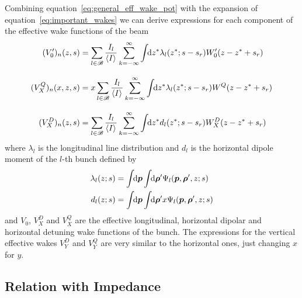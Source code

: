     Combining equation~\eqref{eq:general_eff_wake_pot} with the expansion of equation~\eqref{eq:important_wakes} we can derive expressions for each component of the effective wake functions of the beam
    \begin{subequations}\label{eq:general_eff_wakes}
    \begin{align}\label{eq:general_eff_long_wake}
	  	(V_0')_n(z, s) &= \sum_{l\in\mathscr{B}}\frac{I_l}{\left\langle I \right\rangle_{{}}}\sum_{k=-\infty}^\infty\int\!\!\text{d}z^* \lambda_l(z^*; s - s_r)W'_0(z - z^* + s_r)
        \\[3mm]\label{eq:general_eff_quad_wake}
	  	(V^Q_X)_n(x, z, s) &= x\sum_{l\in\mathscr{B}}\frac{I_l}{\left\langle I \right\rangle_{{}}}\sum_{k=-\infty}^\infty\int\!\!\text{d}z^* \lambda_l(z^*; s - s_r)W^Q(z-z^* + s_r)
        \\[3mm]\label{eq:general_eff_dip_wake}
	  	(V^D_X)_n(z, s) &= \sum_{l\in\mathscr{B}}\frac{I_l}{\left\langle I \right\rangle_{{}}}\sum_{k=-\infty}^\infty\int\!\!\text{d}z^* d_l(z^*; s - s_r)W^D_X(z-z^* + s_r)
    \end{align}
    \end{subequations}
    where $\lambda_l$ is the longitudinal line distribution and $d_l$ is the horizontal dipole moment of the $l$-th bunch defined by
    \begin{align}\label{eq:definition_long_distributions}
	  	\lambda_l(z; s) = \udefint{\vect{p}}{\udefint{\vect{\rho}'}{
	  			&\Psi_l(\vect{p},\vect{\rho}',z; s)}}\\
	  	d_l(z; s) = \udefint{\vect{p}}{\udefint{\vect{\rho}'}{
	  			&x\Psi_l(\vect{p},\vect{\rho}',z; s)}}
    \end{align}
    and $V_0$, $V^D_X$ and $V^Q_X$ are the effective longitudinal, horizontal dipolar and horizontal detuning wake functions of the bunch. The expressions for the vertical effective wakes $V^D_Y$ and $V^Q_Y$ are very similar to the horizontal ones, just changing $x$ for $y$.

\subsection{Relation with Impedance}\label{ssec:relation_with_impedance}

